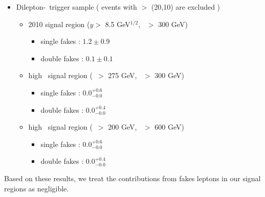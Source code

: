 \begin{itemize}
\item Dilepton-\Ht\ trigger sample ( events with \pt $>$ (20,10) are excluded 
)
\begin{itemize}
\item 2010 signal region ($y >$ 8.5 GeV$^{1/2}$, \Ht\ $>$ 300 GeV)
   \begin{itemize} 
   \item single fakes : $1.2 \pm 0.9$
   \item double fakes : $0.1 \pm 0.1$
   \end{itemize}  
\item high \met\ signal region (\met\ $>$ 275 GeV, \Ht\ $>$ 300 GeV)
   \begin{itemize} 
   \item single fakes : $0.0^{+0.6}_{-0.0}$
   \item double fakes : $0.0^{+0.4}_{-0.0}$
   \end{itemize}  
\item high \Ht\ signal region (\met\ $>$ 200 GeV, \Ht\ $>$ 600 GeV)
   \begin{itemize} 
   \item single fakes : $0.0^{+0.6}_{-0.0}$
   \item double fakes : $0.0^{+0.4}_{-0.0}$
   \end{itemize}  
\end{itemize}
\end{itemize}

Based on these results, we treat the contributions from fakes leptons in our signal
regions as negligible.
